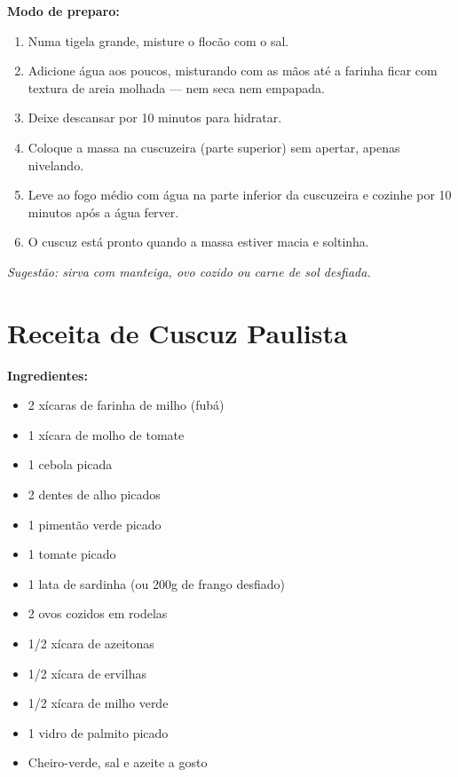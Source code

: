 \documentclass[12pt,a4paper,openright]{book}
\begin{document}
\textbf{Modo de preparo:}
\begin{enumerate}
    \item Numa tigela grande, misture o flocão com o sal.
    \item Adicione água aos poucos, misturando com as mãos até a farinha ficar com textura de areia molhada --- nem seca nem empapada.
    \item Deixe descansar por 10 minutos para hidratar.
    \item Coloque a massa na cuscuzeira (parte superior) sem apertar, apenas nivelando.
    \item Leve ao fogo médio com água na parte inferior da cuscuzeira e cozinhe por 10 minutos após a água ferver.
    \item O cuscuz está pronto quando a massa estiver macia e soltinha.
\end{enumerate}

\textit{Sugestão: sirva com manteiga, ovo cozido ou carne de sol desfiada.}

\section{Receita de Cuscuz Paulista}

\textbf{Ingredientes:}
\begin{itemize}
    \item 2 xícaras de farinha de milho (fubá)
    \item 1 xícara de molho de tomate
    \item 1 cebola picada
    \item 2 dentes de alho picados
    \item 1 pimentão verde picado
    \item 1 tomate picado
    \item 1 lata de sardinha (ou 200g de frango desfiado)
    \item 2 ovos cozidos em rodelas
    \item 1/2 xícara de azeitonas
    \item 1/2 xícara de ervilhas
    \item 1/2 xícara de milho verde
    \item 1 vidro de palmito picado
    \item Cheiro-verde, sal e azeite a gosto
\end{itemize}
\end{document}

